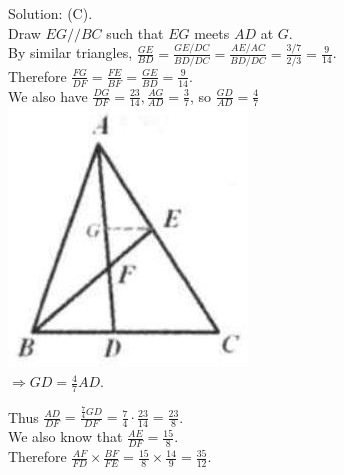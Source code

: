 \documentclass{article}
\begin{document}
Solution: (C).\\
Draw \(E G / / B C\) such that \(E G\) meets \(A D\) at \(G\).\\
By similar triangles, \(\frac{G E}{B D}=\frac{G E / D C}{B D / D C}=\frac{A E / A C}{B D / D C}=\frac{3 / 7}{2 / 3}=\frac{9}{14}\).\\
Therefore \(\frac{F G}{D F}=\frac{F E}{B F}=\frac{G E}{B D}=\frac{9}{14}\).\\
We also have \(\frac{D G}{D F}=\frac{23}{14}, \frac{A G}{A D}=\frac{3}{7}\), so \(\frac{G D}{A D}=\frac{4}{7}\)\\
\centering
\includegraphics[width=\textwidth]{images/reasoning_image_1.jpg}\\
\(\Rightarrow G D=\frac{4}{7} A D\).


Thus \(\frac{A D}{D F}=\frac{\frac{7}{4} G D}{D F}=\frac{7}{4} \cdot \frac{23}{14}=\frac{23}{8}\).\\
We also know that \(\frac{A E}{D F}=\frac{15}{8}\).\\
Therefore \(\frac{A F}{F D} \times \frac{B F}{F E}=\frac{15}{8} \times \frac{14}{9}=\frac{35}{12}\).\\
\end{document}

